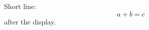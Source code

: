 \documentclass[10pt]{article}
\begin{document}
Short line:
\[ a + b = c \]
after the display.
\end{document}
